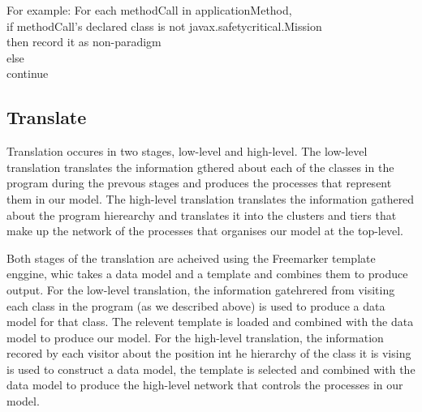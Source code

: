 \documentclass[10pt,a4paper]{article}
\newenvironment{ttSection}{\ttfamily}{\par}
\begin{document}
For example:
\begin{ttSection}
For each methodCall in applicationMethod, \\
if methodCall's declared class is not javax.safetycritical.Mission \\
then record it as non-paradigm\\
else\\
continue
\end{ttSection}


\subsection{Translate}
\label{sec:translation}

Translation occures in two stages, low-level and high-level. The low-level translation
translates the information gthered about each of the classes in the program during the prevous stages and produces the processes that represent them in our model. The high-level translation translates the information gathered about the program hierearchy and translates it into the clusters and tiers that make up the network of the processes that organises our model at the top-level.

Both stages of the translation are acheived using the Freemarker template enggine, whic takes a data model and a template and combines them to produce output. For the low-level translation, the information gatehrered from visiting each class in the program (as we described above) is used to produce a data model for that class. The relevent template is loaded and combined with the data model to produce our model. For the high-level translation, the information recored by each visitor about the position int he hierarchy of the class it is vising is used to construct a data model, the template is selected and combined with the data model to produce the high-level network that controls the processes in our model.
\end{document}
